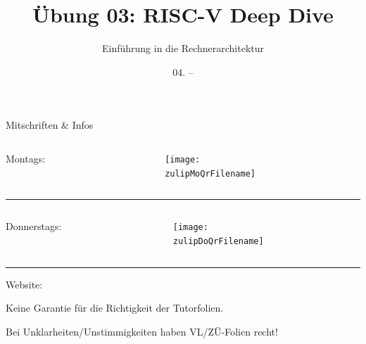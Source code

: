 \documentclass[
  german,            %
  aspectratio=169,    %
]{tumbeamer}
\title{Übung 03: RISC-V Deep Dive}
\subtitle{Einführung in die Rechnerarchitektur}
\author{\theAuthorName}
\institute{\theGroupName\\\theSchoolName\\\theUniversityName}
\date{04. -- \DTMdisplaydate{2024}{11}{10}{-1}}
\begin{document}
\maketitle

\begin{frame}[c]{Mitschriften \& Infos}{}
  \begin{minipage}[t]{\textwidth}
    \begin{columns}[c]
      \begin{column}{0.8\textwidth}
        Montags: \href{\zulipMo}{\zulipMo}
      \end{column}
      \begin{column}{0.2\textwidth}
        \texttt{[image: \\zulipMoQrFilename]}
      \end{column}
    \end{columns}
  \end{minipage}
  \rule{\textwidth}{0.4pt}
  \begin{minipage}[t]{\textwidth}
    \begin{columns}[c]
      \begin{column}{0.8\textwidth}
        Donnerstags: \href{\zulipDo}{\zulipDo}
      \end{column}
      \begin{column}{0.2\textwidth}
        \texttt{[image: \\zulipDoQrFilename]}
      \end{column}
    \end{columns}
  \end{minipage}
  \ifdefined\myWebsite
  \rule{\textwidth}{0.4pt}
  \centering
  Website: \href{\myWebsite}{\myWebsite}
  \fi
\end{frame}

\begin{frame}[c]{}{}
  \begin{center}
    \LARGE  Keine Garantie für die Richtigkeit der Tutorfolien.

    \Large Bei Unklarheiten/Unstimmigkeiten haben VL/ZÜ-Folien recht!
  \end{center}
\end{frame}
\end{document}
